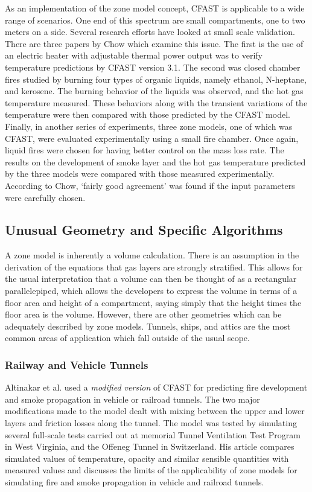 As an implementation of the zone model concept, CFAST is applicable to a wide range of scenarios. One end of this spectrum are small compartments, one to two meters on a side. Several research efforts have looked at small scale validation. There are three papers by Chow \cite{Lui:2003,Chow:1995,Chow:1992} which examine this issue. The first is the use of an electric heater with adjustable thermal power output was to verify temperature predictions by CFAST version 3.1. The second was closed chamber fires studied by burning four types of organic liquids, namely ethanol, N-heptane, and kerosene. The burning behavior of the liquids was observed, and the hot gas temperature measured. These behaviors along with the transient variations of the temperature were then compared with those predicted by the CFAST model. Finally, in another series of experiments, three zone models, one of which was CFAST, were evaluated experimentally using a small fire chamber. Once again, liquid fires were chosen for having better control on the mass loss rate. The results on the development of smoke layer and the hot gas temperature predicted by the three models were compared with those measured experimentally. According to Chow, `fairly good agreement' was found if the input parameters were carefully chosen.

\subsection{Unusual Geometry and Specific Algorithms}

A zone model is inherently a volume calculation. There is an assumption in the derivation of the equations that gas layers are strongly stratified. This allows for the usual interpretation that a volume can then be thought of as a rectangular parallelepiped, which allows the developers to express the volume in terms of a floor area and height of a compartment, saying simply that the height times the floor area is the volume. However, there are other geometries which can be adequately described by zone models. Tunnels, ships, and attics are the most common areas of application which fall outside of the usual scope.

\subsubsection{Railway and Vehicle Tunnels}

Altinakar et al. \cite{Altinakar:1997} used a \emph{modified version} of CFAST for predicting fire development and smoke propagation in vehicle or railroad tunnels. The two major modifications made to the model dealt with mixing between the upper and lower layers and friction losses along the tunnel. The model was tested by simulating several full-scale tests carried out at memorial Tunnel Ventilation Test Program in West Virginia, and the Offeneg Tunnel in Switzerland. His article compares simulated values of temperature, opacity and similar sensible quantities with measured values and discusses the limits of the applicability of zone models for simulating fire and smoke propagation in vehicle and railroad tunnels. 

